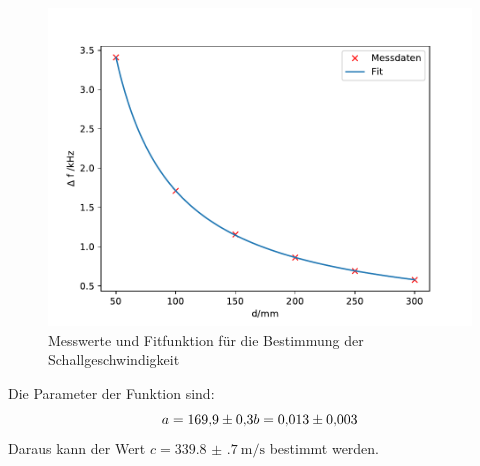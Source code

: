 \begin{figure}
    \caption{Messwerte und Fitfunktion für die Bestimmung der Schallgeschwindigkeit}
\includegraphics[width = \textwidth]{figure/Schallgeschwindigkeit.pdf}
\end{figure}
\FloatBarrier
Die Parameter der Funktion sind:
\begin{equation*}
    a= \num{169.9(3)}\\
    b= \num{0.013(3)}
\end{equation*}
Daraus kann der Wert $c=\SI{339.8(7)}{\meter\per\second}$ bestimmt werden.